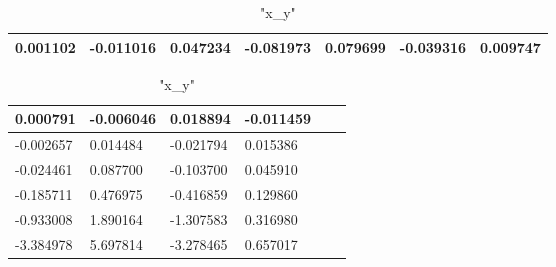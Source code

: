 \documentclass[12pt]{article}
\begin{document}
\begin{table}[h]
\caption { "x_y" }
\center
\begin{tabular} {|l|l|l|l|l|l|l|}
 \hline
 0.001102 & -0.011016 & 0.047234 & -0.081973 & 0.079699 & -0.039316 & 0.009747 \\ \hline 

\end{tabular}
\end{table} 
\begin{table}[h]
\caption { "x_y" }
\center
\begin{tabular} {|l|l|l|l|l|l|}
 \hline
0.000791 & -0.006046 & 0.018894 & -0.011459\\ \hline 
-0.002657 & 0.014484 & -0.021794 & 0.015386\\ \hline 
-0.024461 & 0.087700 & -0.103700 & 0.045910\\ \hline 
-0.185711 & 0.476975 & -0.416859 & 0.129860\\ \hline 
-0.933008 & 1.890164 & -1.307583 & 0.316980\\ \hline 
-3.384978 & 5.697814 & -3.278465 & 0.657017\\ \hline 

\end{tabular}
\end{table} 
\end{document}
